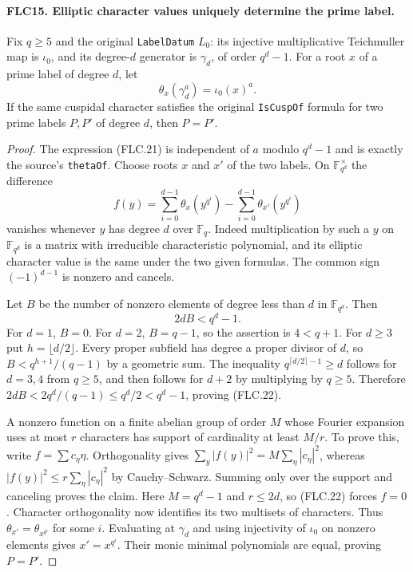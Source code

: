 \documentclass[11pt,a4paper]{article}
\numberwithin{equation}{section}
\theoremstyle{remark}\newtheorem{remark}[theorem]{Remark}
\begin{document}
\paragraph{FLC15. Elliptic character values uniquely determine the prime label.}
\label{claim:FLC15}
Fix $q\ge5$ and the original \texttt{Label\allowbreak Datum} $L_0$:
its injective multiplicative Teichmuller map is $\iota_0$,
and its degree-$d$ generator is $\gamma_d$, of order $q^d-1$.
For a root $x$ of a prime label of degree $d$, let
\[
 \theta_x(\gamma_d^a)=\iota_0(x)^a.
 \tag{FLC.21}
\]
If the same cuspidal character satisfies the original
\texttt{Is\allowbreak Cusp\allowbreak Of} formula for two prime labels $P,P'$ of
degree $d$, then $P=P'$.
\begin{proof}
The expression (FLC.21) is independent of $a$ modulo
$q^d-1$ and is exactly the source's \texttt{theta\allowbreak Of}.
Choose roots $x$ and $x'$ of the two labels.  On
$\mathbb F_{q^d}^{\times}$ the difference
\[
 f(y)=\sum_{i=0}^{d-1}\theta_x(y^{q^i})
              -\sum_{i=0}^{d-1}\theta_{x'}(y^{q^i})
\]
vanishes whenever $y$ has degree $d$ over $\mathbb F_q$.
Indeed multiplication by such a $y$ on
$\mathbb F_{q^d}$ is a matrix with irreducible characteristic
polynomial, and its elliptic character value is the same
under the two given formulas.  The common sign
$(-1)^{d-1}$ is nonzero and cancels.

Let $B$ be the number of nonzero elements of degree less than
$d$ in $\mathbb F_{q^d}$.  Then
\[
                         2dB<q^d-1.                 \tag{FLC.22}
\]
For $d=1$, $B=0$.  For $d=2$, $B=q-1$, so the assertion is
$4<q+1$.  For $d\ge3$ put $h=\lfloor d/2\rfloor$.
Every proper subfield has degree a proper divisor of $d$,
so $B<q^{h+1}/(q-1)$ by a geometric sum.
The inequality $q^{\lceil d/2\rceil-1}\ge d$ follows for
$d=3,4$ from $q\ge5$, and then follows for $d+2$ by
multiplying by $q\ge5$.  Therefore
$2dB<2q^d/(q-1)\le q^d/2<q^d-1$, proving (FLC.22).

A nonzero function on a finite abelian group of order $M$
whose Fourier expansion uses at most $r$ characters has
support of cardinality at least $M/r$.  To prove this,
write $f=\sum c_\eta\eta$.  Orthogonality gives
$\sum_y|f(y)|^2=M\sum_\eta|c_\eta|^2$, whereas
$|f(y)|^2\le r\sum_\eta|c_\eta|^2$ by Cauchy--Schwarz.
Summing only over the support and canceling proves the claim.
Here $M=q^d-1$ and $r\le2d$, so (FLC.22) forces $f=0$.
Character orthogonality now identifies its two multisets of
characters.  Thus $\theta_{x'}=\theta_{x^{q^i}}$ for some $i$.
Evaluating at $\gamma_d$ and using injectivity of $\iota_0$
on nonzero elements gives $x'=x^{q^i}$.  Their monic minimal
polynomials are equal, proving $P=P'$.
\end{proof}
\end{document}
